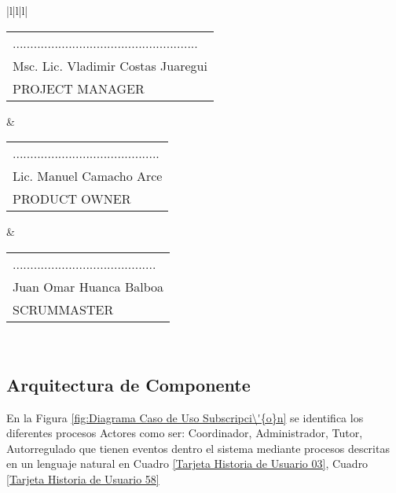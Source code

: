 \begin{minipage}[b]{\hsize}
\begin{tabular}{|l|l|l|}
 \\ \hline
\begin{tabular}[c]{@{}l@{}}.....................................................\\ Msc. Lic. Vladimir Costas Juaregui\\ PROJECT MANAGER\end{tabular} & \begin{tabular}[c]{@{}l@{}}..........................................\\ Lic. Manuel Camacho Arce\\ PRODUCT OWNER\end{tabular} & \begin{tabular}[c]{@{}l@{}}.........................................\\ Juan Omar Huanca Balboa\\ SCRUMMASTER\end{tabular} \\ \hline
\end{tabular}
\label{Tarjeta Historia de Usuario 58}
\end{minipage}

\subsection{Arquitectura de Componente}

En la Figura \ref{fig:Diagrama Caso de Uso Subscripci\'{o}n} se identifica los 
diferentes procesos Actores como ser: Coordinador, Administrador, Tutor, 
Autorregulado que tienen eventos dentro el sistema mediante procesos descritas
en un lenguaje natural en Cuadro \ref{Tarjeta Historia de Usuario 03}, Cuadro
\ref{Tarjeta Historia de Usuario 58}

\begin{minipage}{1.0\textwidth}
	\centering
	\label{fig:Diagrama Caso de Uso Subscripci\'{o}n}
\end{minipage}

